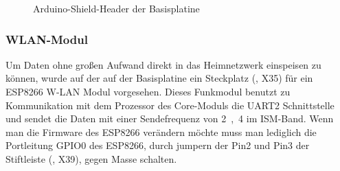 \begin{figure}[htb]
    \centering
    \qquad
    \qquad
    \caption[Arduino-Shield-Header der Basisplatine]{Arduino-Shield-Header der \gls{Basisplatine}}
    \label{fig:basisplatine-arduino}
\end{figure}

\subsubsection{WLAN-Modul}
Um Daten ohne großen Aufwand direkt in das Heimnetzwerk einspeisen zu können, wurde auf der auf der \gls{Basisplatine} ein Steckplatz (, X35) für ein ESP8266 W-LAN Modul vorgesehen. Dieses Funkmodul benutzt zu Kommunikation mit dem Prozessor des Core-Moduls die UART2 Schnittstelle und sendet die Daten mit einer Sendefrequenz von \unit{2,4}{\giga\hertz} im ISM-Band. Wenn man die Firmware des ESP8266 verändern möchte muss man lediglich die Portleitung GPIO0 des ESP8266, durch jumpern der Pin2 und Pin3 der Stiftleiste (, X39), gegen Masse schalten.

